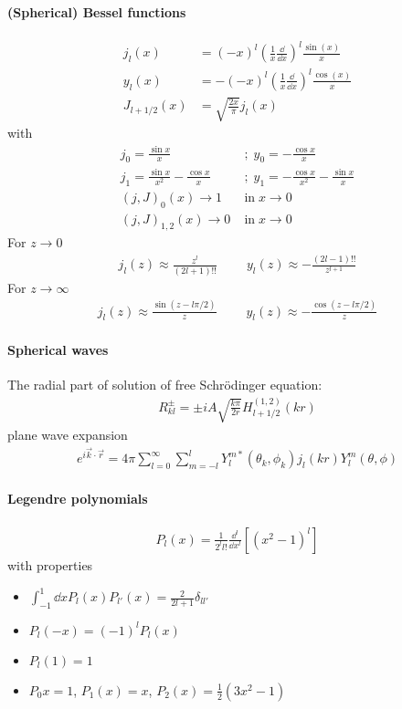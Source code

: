 \paragraph{(Spherical) Bessel functions}
\begin{align}
	j_l (x) &= (-x)^l \left( \frac{1}{x}\frac{\dd}{\dd x} \right)^l \frac{\sin(x)}{x} \\
	y_l (x) &= -(-x)^l \left( \frac{1}{x}\frac{\dd}{\dd x} \right)^l \frac{\cos(x)}{x} \\
	J_{l+1/2}(x) &= \sqrt{\frac{2x}{\pi}}j_l(x)
\end{align}
with
\begin{align*}
	j_{0} = \frac{\sin{x}}{x} \; &; \; y_{0} = -\frac{\cos{x}}{x}\\
	j_{1} = \frac{\sin{x}}{x^2}-\frac{\cos{x}}{x} \; &; \; y_{1} = -\frac{\cos{x}}{x^2} - \frac{\sin{x}}{x} \\
	(j, J)_0(x) \rightarrow 1 \;&\text{in}\; x \rightarrow 0 \\
	(j, J)_{1,2}(x) \rightarrow 0 \;&\text{in}\; x \rightarrow 0
\end{align*}
For $z \rightarrow 0$
\begin{align}
	j_l(z) \approx \frac{z^l}{(2l+1)!!} \quad \; \quad y_l(z) \approx -\frac{(2l-1)!!}{z^{l+1}}
\end{align}
For $z \rightarrow \infty$
\begin{align}
	j_l(z) \approx \frac{\sin(z-l\pi/2)}{z} \quad \; \quad y_l(z) \approx -\frac{\cos(z-l\pi/2)}{z}
\end{align}
\paragraph{Spherical waves}
The radial part of solution of free Schrödinger equation:
\begin{align}
	R_{kl}^{\pm} = \pm iA\sqrt{\frac{k\pi}{2r}} H_{l+1/2}^{(1,2)}(kr)
\end{align}
plane wave expansion
\begin{align}
	e^{i\vec{k}\cdot\vec{r}} = 4\pi \sum_{l=0}^\infty \sum_{m=-l}^{l} Y^{m*}_l (\theta_k, \phi_k) j_l(kr) Y_l^m (\theta,\phi)
\end{align}
\paragraph{Legendre polynomials}
\begin{align}
	P_l(x) = \frac{1}{2^l l!}\frac{\dd^l}{\dd x^l} \left[ (x^2 - 1)^l \right]
\end{align}
with properties
\begin{itemize}
	\item $\int^1_{-1}\dd x P_l(x) P_{l'}(x) = \frac{2}{2l+1}\delta_{ll'}$
	\item $P_l(-x) = (-1)^l P_l(x)$
	\item $P_l(1)=1$
	\item $P_0{x} = 1$, $P_1(x) = x$, $P_2(x) = \frac{1}{2}(3x^2-1)$
\end{itemize}
